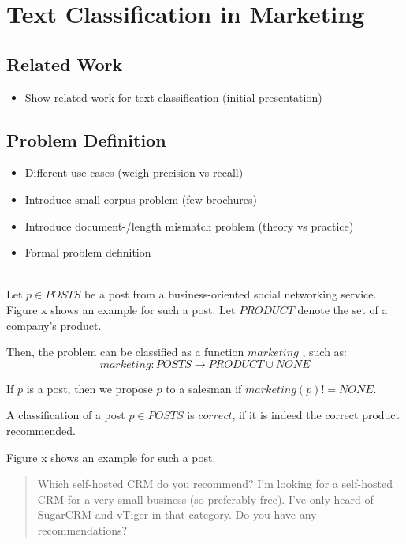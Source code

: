 
\section{Text Classification in Marketing}
\label{sec:background}

\subsection{Related Work}

\begin{itemize}
	\item Show related work for text classification (initial presentation)
\end{itemize}

\subsection{Problem Definition}

\begin{itemize}
	\item Different use cases (weigh precision vs recall)
	\item Introduce small corpus problem (few brochures)
	\item Introduce document-/length mismatch problem (theory vs practice)
	\item Formal problem definition
\end{itemize}

 \\
Let $p \in POSTS$ be a post from a business-oriented social networking service.
Figure x shows an example for such a post.
Let $PRODUCT$ denote the set of a company's product.

Then, the problem can be classified as a function $marketing$ , such as:
\begin{displaymath}
	marketing: POSTS \to PRODUCT \cup {NONE}
\end{displaymath}

If $p$ is a post, then we propose $p$ to a salesman if $marketing(p) != NONE$.

A classification of a post $p \in POSTS$ is $correct$, if it is indeed the correct product recommended.

Figure x shows an example for such a post.

\begin{quote}
	Which self-hosted CRM do you recommend?
	I'm looking for a self-hosted CRM for a very small business (so preferably free).
	I've only heard of SugarCRM and vTiger in that category. Do you have any recommendations?
\end{quote}

